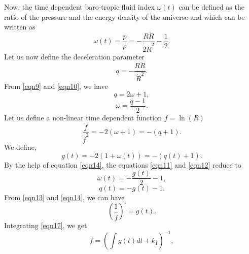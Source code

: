 \documentclass[11pt]{article}
\theoremstyle{theorem}
\theoremstyle{defi}
\begin{document}
Now, the time dependent baro-tropic fluid index $\omega (t)$ can be defined as the ratio of the pressure and the energy density of the universe and which can be written as
\begin{equation}
\label{eqn9}
\omega (t)=\frac{p}{\rho}= -\frac{R\ddot{R}}{2{\dot{R}^2}}-\frac{1}{2}.
\end{equation}
Let us now define the deceleration parameter
\begin{equation}
\label{eqn10}
q=-\frac{R{\ddot{R}}}{\dot{R}^2}.
\end{equation}
From \eqref{eqn9} and \eqref{eqn10}, we have
\begin{equation}
\label{eqn11}
q=2\omega +1,
\end{equation}
\begin{equation}
\label{eqn12}
\omega=\frac{q-1}{2}.
\end{equation}
Let us define a non-linear time dependent function $f=\ln(R)$
\begin{equation}
\label{eqn13}
\frac{\ddot{f}}{\dot{f}^2}=-2(\omega +1)=-(q+1).
\end{equation}
We define,
\begin{equation}
\label{eqn14}
g(t)=-2(1+\omega (t))=-(q(t)+1).
\end{equation}
By the help of equation \eqref{eqn14}, the equations \eqref{eqn11} and \eqref{eqn12} reduce to
\begin{equation}
\label{eqn15}
\omega (t)=-\frac{g(t)}{2}-1,
\end{equation}
\begin{equation}
\label{eqn16}
q(t)=-g(t)-1.
\end{equation}
From \eqref{eqn13} and \eqref{eqn14}, we can have
\begin{equation}
\label{eqn17}
{\left(\frac{1}{\dot{f}}\right)}^{\cdot}=g(t).
\end{equation}
Integrating \eqref{eqn17}, we get
\begin{equation}
\label{eqn18}
\dot{f}=\left(\int g(t)dt+k_1\right)^{-1},
\end{equation}
\end{document}
